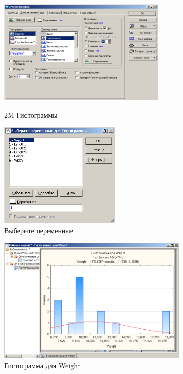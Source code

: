 \begin{figure}[!h]
  \centering
  \begin{minipage}{0.49\textwidth}
    \centering

    \includegraphics[height=5cm]
    {inc/var5__8.PNG}

    \caption{2M Гистограммы}
    \label{fig:var5__8}
  \end{minipage}
  \begin{minipage}{0.49\textwidth}
    \centering

    \includegraphics[height=5cm]
    {inc/var5__9.PNG}

    \caption{Выберите переменные}
    \label{fig:var5__9}
  \end{minipage}
\end{figure}

\begin{figure}[!h]
  \centering

  \includegraphics[height=6cm]
  {inc/var5__10.PNG}

  \caption{Гистограмма для Weight}

  \label{fig:var5__10}
\end{figure}

